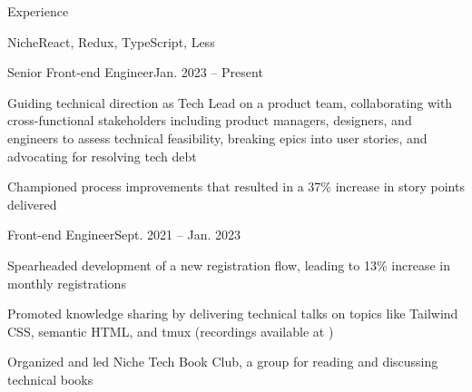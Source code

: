 \documentclass{resume} %
\begin{document}

\begin{rSection}{Experience}
\begin{rCompany}{Niche}{React, Redux, TypeScript, Less}{}{}
\begin{rPromotion}{}{}{Senior Front-end Engineer}{Jan. 2023 – Present}
\item Guiding technical direction as Tech Lead on a product team, collaborating with cross-functional stakeholders including product managers, designers, and engineers to assess technical feasibility, breaking epics into user stories, and advocating for resolving tech debt
\item Championed process improvements that resulted in a 37\% increase in story points delivered
\end{rPromotion}


\begin{rRole}{}{}{Front-end Engineer}{Sept. 2021 – Jan. 2023}
\item Spearheaded development of a new registration flow, leading to 13\% increase in monthly registrations
\item Promoted knowledge sharing by delivering technical talks on topics like Tailwind CSS, semantic HTML, and tmux (recordings available at \href{http://jgs.lol/}{})
\item Organized and led Niche Tech Book Club, a group for reading and discussing technical books
\end{rRole}
\end{rCompany}


\end{rSection}
\end{document}
